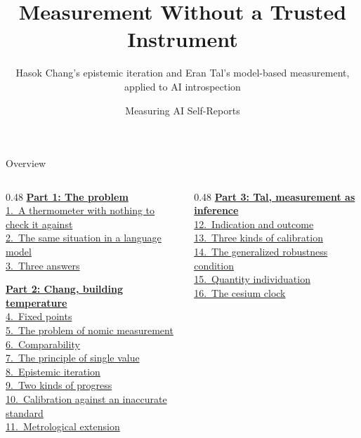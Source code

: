 \documentclass[aspectratio=169,11pt]{beamer}
\title{Measurement Without a Trusted Instrument}
\subtitle{Hasok Chang's epistemic iteration and Eran Tal's model-based measurement, applied to AI introspection}
\author{Measuring AI Self-Reports}
\date{}
\institute{}
\begin{document}
\begin{frame}[plain]\vspace*{-1.5em}\titlepage\end{frame}

\begin{frame}{Overview}\footnotesize\vspace*{-0.8em}
\begin{columns}[T]
\begin{column}{0.48\textwidth}
\hyperlink{part1}{\textbf{Part 1: The problem}}\\[0.1em]
{\scriptsize%
\quad\hyperlink{nothermo}{1.~A thermometer with nothing to check it against}\\%
\quad\hyperlink{llm}{2.~The same situation in a language model}\\%
\quad\hyperlink{answers}{3.~Three answers}%
}\vspace{0.25em}

\hyperlink{part2}{\textbf{Part 2: Chang, building temperature}}\\[0.1em]
{\scriptsize%
\quad\hyperlink{fixed}{4.~Fixed points}\\%
\quad\hyperlink{nomic}{5.~The problem of nomic measurement}\\%
\quad\hyperlink{compar}{6.~Comparability}\\%
\quad\hyperlink{single}{7.~The principle of single value}\\%
\quad\hyperlink{iter}{8.~Epistemic iteration}\\%
\quad\hyperlink{progress}{9.~Two kinds of progress}\\%
\quad\hyperlink{inaccurate}{10.~Calibration against an inaccurate standard}\\%
\quad\hyperlink{extension}{11.~Metrological extension}%
}
\end{column}
\begin{column}{0.48\textwidth}
\hyperlink{part3}{\textbf{Part 3: Tal, measurement as inference}}\\[0.1em]
{\scriptsize%
\quad\hyperlink{indication}{12.~Indication and outcome}\\%
\quad\hyperlink{calib}{13.~Three kinds of calibration}\\%
\quad\hyperlink{grc}{14.~The generalized robustness condition}\\%
\quad\hyperlink{individ}{15.~Quantity individuation}\\%
\quad\hyperlink{cesium}{16.~The cesium clock}%
}\vspace{0.25em}


\end{column}
\end{columns}
\end{frame}
\end{document}
